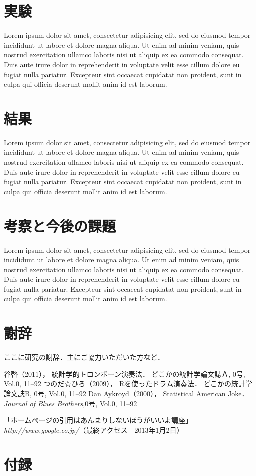 \documentclass[12pt,a4j]{jreport}
\begin{document}
\chapter{実験}
Lorem ipsum dolor sit amet, consectetur adipisicing elit, sed do eiusmod tempor incididunt ut labore et dolore magna aliqua. Ut enim ad minim veniam, quis nostrud exercitation ullamco laboris nisi ut aliquip ex ea commodo consequat. Duis aute irure dolor in reprehenderit in voluptate velit esse cillum dolore eu fugiat nulla pariatur. Excepteur sint occaecat cupidatat non proident, sunt in culpa qui officia deserunt mollit anim id est laborum.

\chapter{結果}
Lorem ipsum dolor sit amet, consectetur adipisicing elit, sed do eiusmod tempor incididunt ut labore et dolore magna aliqua. Ut enim ad minim veniam, quis nostrud exercitation ullamco laboris nisi ut aliquip ex ea commodo consequat. Duis aute irure dolor in reprehenderit in voluptate velit esse cillum dolore eu fugiat nulla pariatur. Excepteur sint occaecat cupidatat non proident, sunt in culpa qui officia deserunt mollit anim id est laborum.

\chapter{考察と今後の課題}
Lorem ipsum dolor sit amet, consectetur adipisicing elit, sed do eiusmod tempor incididunt ut labore et dolore magna aliqua. Ut enim ad minim veniam, quis nostrud exercitation ullamco laboris nisi ut aliquip ex ea commodo consequat. Duis aute irure dolor in reprehenderit in voluptate velit esse cillum dolore eu fugiat nulla pariatur. Excepteur sint occaecat cupidatat non proident, sunt in culpa qui officia deserunt mollit anim id est laborum.


\chapter*{謝辞}
\pagestyle{plain}
ここに研究の謝辞．主にご協力いただいた方など．

\begin{thebibliography}{3}
谷啓（2011），
統計学的トロンボーン演奏法．
どこかの統計学論文誌Ａ, 0号, Vol.0, 11--92 
つのだ☆ひろ（2009），
Rを使ったドラム演奏法．
どこかの統計学論文誌B, 0号, Vol.0, 11--92 
Dan Aykroyd（2000），
Statistical American Joke．
{\it Journal of Blues Brothers},0号, Vol.0, 11--92 

「ホームページの引用はあんまりしないほうがいいよ講座」{\it http://www.google.co.jp/}（最終アクセス　2013年1月2日）
\end{thebibliography}

\chapter*{付録}
\end{document}
